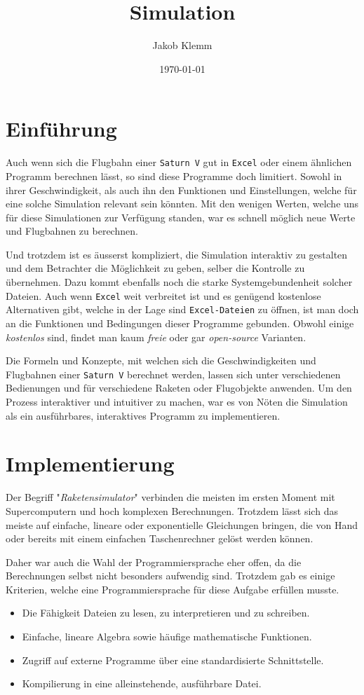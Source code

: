 \documentclass[11pt]{article}
\author{Jakob Klemm}
\date{\today}
\title{Simulation}
\begin{document}
\maketitle
\tableofcontents

\section{Einführung}
\label{sec:orgfd3e740}
Auch wenn sich die Flugbahn einer \texttt{Saturn V} gut in \texttt{Excel} oder einem ähnlichen
Programm berechnen lässt, so sind diese Programme doch limitiert. Sowohl in
ihrer Geschwindigkeit, als auch ihn den Funktionen und Einstellungen, welche für
eine solche Simulation relevant sein könnten. Mit den wenigen Werten, welche uns
für diese Simulationen zur Verfügung standen, war es schnell möglich neue Werte
und Flugbahnen zu berechnen.

Und trotzdem ist es äusserst kompliziert, die Simulation interaktiv zu gestalten
und dem Betrachter die Möglichkeit zu geben, selber die Kontrolle zu übernehmen.
Dazu kommt ebenfalls noch die starke Systemgebundenheit solcher Dateien. Auch
wenn \texttt{Excel} weit verbreitet ist und es genügend kostenlose Alternativen gibt,
welche in der Lage sind \texttt{Excel-Dateien} zu öffnen, ist man doch an die Funktionen
und Bedingungen dieser Programme gebunden. Obwohl einige \emph{kostenlos} sind, findet
man kaum \emph{freie} oder gar \emph{open-source} Varianten.

Die Formeln und Konzepte, mit welchen sich die Geschwindigkeiten und Flugbahnen
einer \texttt{Saturn V} berechnet werden, lassen sich unter verschiedenen Bedienungen und
für verschiedene Raketen oder Flugobjekte anwenden. Um den Prozess interaktiver
und intuitiver zu machen, war es von Nöten die Simulation als ein ausführbares,
interaktives Programm zu implementieren.
\section{Implementierung}
\label{sec:org48904cb}
Der Begriff "\emph{Raketensimulator}" verbinden die meisten im ersten Moment mit
Supercomputern und hoch komplexen Berechnungen. Trotzdem lässt sich das meiste
auf einfache, lineare oder exponentielle Gleichungen bringen, die von Hand oder
bereits mit einem einfachen Taschenrechner gelöst werden können.

Daher war auch die Wahl der Programmiersprache eher offen, da die Berechnungen
selbst nicht besonders aufwendig sind. Trotzdem gab es einige Kriterien, welche
eine Programmiersprache für diese Aufgabe erfüllen musste.
\begin{itemize}
\item Die Fähigkeit Dateien zu lesen, zu interpretieren und zu schreiben.
\item Einfache, lineare Algebra sowie häufige mathematische Funktionen.
\item Zugriff auf externe Programme über eine standardisierte Schnittstelle.
\item Kompilierung in eine alleinstehende, ausführbare Datei.
\end{itemize}
\end{document}
